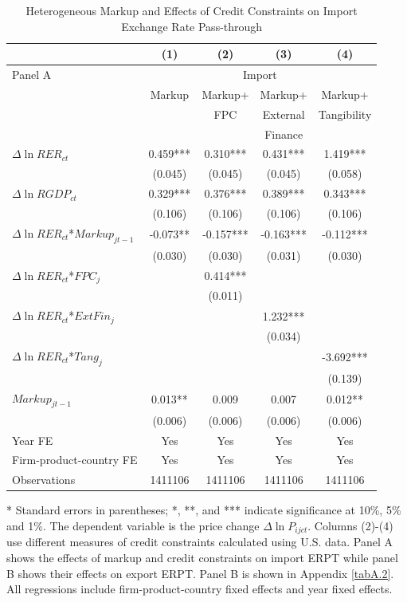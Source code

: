 \documentclass[12pt]{article}
\begin{document}
\begin{table}[htbp]
	\centering
	\caption{Heterogeneous Markup and Effects of Credit Constraints on Import Exchange Rate Pass-through}
	\begin{threeparttable}
		\begin{tabular}{lcccc}
			\midrule          & (1)   & (2)   & (3)   & (4)     \\
			\midrule
			Panel A & \multicolumn{4}{c}{Import} \\
			& Markup & Markup+& Markup+ & Markup+      \\
			&       &FPC& External & Tangibility        \\
			&       & & Finance &  	          \\
			\midrule
			$\Delta \ln RER_{ct}$ & 0.459*** & 0.310*** & 0.431*** & 1.419***   \\
			& (0.045) & (0.045) & (0.045) & (0.058) \\
			$\Delta \ln RGDP_{ct}$ & 0.329*** & 0.376*** & 0.389*** & 0.343*** \\
			& (0.106) & (0.106) & (0.106) & (0.106)  \\
			$\Delta \ln RER_{ct}$*$Markup_{jt-1}$ & -0.073** & -0.157*** & -0.163*** & -0.112*** \\
			& (0.030) & (0.030) & (0.031) & (0.030) \\
			$\Delta \ln RER_{ct}$*$FPC_{j}$ &       & 0.414*** &       &  \\
			&       & (0.011) &       &   \\
			$\Delta \ln RER_{ct}$*$ExtFin_{j}$ &       &       & 1.232*** &  \\
			&       &       & (0.034) &   \\
			$\Delta \ln RER_{ct}$*$Tang_{j}$  &       &       &       & -3.692*** \\
			&       &       &       & (0.139) \\
			$Markup_{jt-1}$ & 0.013** & 0.009 & 0.007 & 0.012**  \\
			& (0.006) & (0.006) & (0.006) & (0.006)  \\
			Year FE  & Yes   & Yes   & Yes   & Yes       \\
			Firm-product-country FE & Yes   & Yes   & Yes   & Yes       \\
			Observations & 1411106 & 1411106 & 1411106 & 1411106  \\
			\bottomrule
		\end{tabular}
		\begin{tablenotes}
			\footnotesize
			\item[*] Standard errors in parentheses; *, **, and *** indicate significance at 10\%, 5\% and 1\%. The dependent variable is the price change $\Delta \ln P_{ijct}$. Columns (2)-(4) use different measures of credit constraints calculated using U.S. data. Panel A shows the effects of markup and credit constraints on import ERPT while panel B shows their effects on export ERPT. Panel B is shown in Appendix \ref{tabA.2}. All regressions include firm-product-country fixed effects and year fixed effects.
		\end{tablenotes}
	\end{threeparttable}
        \label{tab.markup}
\end{table}
\end{document}
